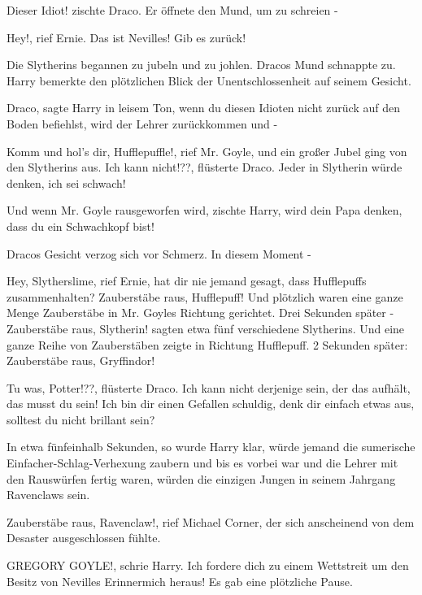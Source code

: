 \glqq{}Dieser Idiot!\grqq{} zischte Draco. Er öffnete den Mund, um zu schreien -

\glqq{}Hey!\grqq{}, rief Ernie. \glqq{}Das ist Nevilles! Gib es zurück!\grqq{}

Die Slytherins begannen zu jubeln und zu johlen. Dracos Mund schnappte zu. Harry
bemerkte den plötzlichen Blick der Unentschlossenheit auf seinem Gesicht.

\glqq{}Draco\grqq{}, sagte Harry in leisem Ton, \glqq{}wenn du diesen Idioten
nicht zurück auf den Boden befiehlst, wird der Lehrer zurückkommen und -\grqq{}

\glqq{}Komm und hol's dir, Hufflepuffle!\grqq{}, rief Mr. Goyle, und ein großer
Jubel ging von den Slytherins aus. \glqq{}Ich kann nicht!??\grqq{}, flüsterte
Draco. \glqq{}Jeder in Slytherin würde denken, ich sei schwach!\grqq{}

\glqq{}Und wenn Mr. Goyle rausgeworfen wird\grqq{}, zischte Harry, \glqq{}wird
dein Papa denken, dass du ein Schwachkopf bist!\grqq{}

Dracos Gesicht verzog sich vor Schmerz. In diesem Moment -

\glqq{}Hey, Slytherslime\grqq{}, rief Ernie, \glqq{}hat dir nie jemand gesagt,
dass Hufflepuffs zusammenhalten? Zauberstäbe raus, Hufflepuff!\grqq{} Und
plötzlich waren eine ganze Menge Zauberstäbe in Mr. Goyles Richtung gerichtet.
Drei Sekunden später - \glqq{}Zauberstäbe raus, Slytherin!\grqq{} sagten etwa
fünf verschiedene Slytherins. Und eine ganze Reihe von Zauberstäben zeigte in
Richtung Hufflepuff. 2 Sekunden später: \glqq{}Zauberstäbe raus,
Gryffindor!\grqq{}

\glqq{}Tu was, Potter!??\grqq{}, flüsterte Draco. \glqq{}Ich kann nicht derjenige
sein, der das aufhält, das musst du sein! Ich bin dir einen Gefallen schuldig,
denk dir einfach etwas aus, solltest du nicht brillant sein?\grqq{}

In etwa fünfeinhalb Sekunden, so wurde Harry klar, würde jemand die sumerische
Einfacher-Schlag-Verhexung zaubern und bis es vorbei war und die Lehrer mit den
Rauswürfen fertig waren, würden die einzigen Jungen in seinem Jahrgang
Ravenclaws sein.

\glqq{}Zauberstäbe raus, Ravenclaw!\grqq{}, rief Michael Corner, der sich
anscheinend von dem Desaster ausgeschlossen fühlte.

\glqq{}GREGORY GOYLE!\grqq{}, schrie Harry. \glqq{}Ich fordere dich zu einem
Wettstreit um den Besitz von Nevilles Erinnermich heraus!\grqq{} Es gab eine
plötzliche Pause.

